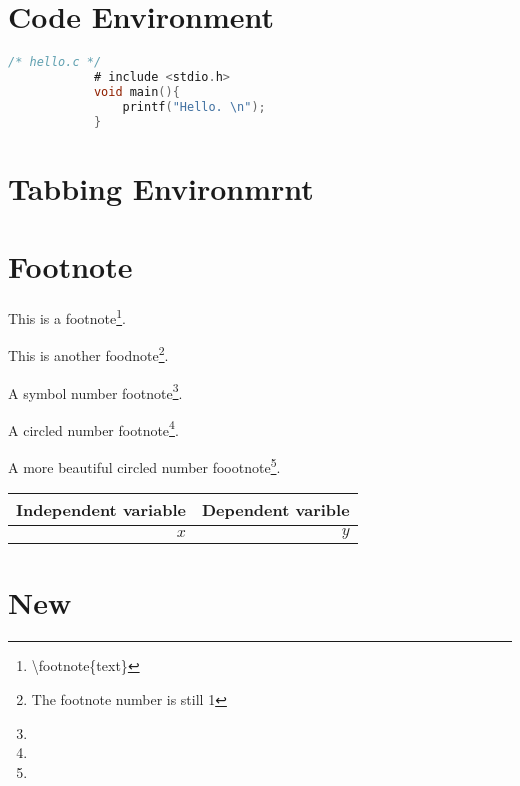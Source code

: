 \documentclass{article}
\begin{document}
    \section{Code Environment}
        \lstset{
            numbers=left,
            numberstyle=\footnotesize,
            basicstyle=\sffamily,
            keywordstyle=\bfseries,
            commentstyle=\rmfamily\itshape,
            stringstyle=\ttfamily
        }                                               %
        \begin{lstlisting}[language=C]
            /* hello.c */
            # include <stdio.h>
            void main(){
                printf("Hello. \n"); 
            }
        \end{lstlisting}
        {
            \lstset{language=C}
        }

    \section{Tabbing Environmrnt}

    \section{Footnote}
        This is a footnote\footnote{\textbackslash footnote\{text\}}. \par
        This is another foodnote\footnote[1]{The footnote number is still 1}. \par
        \renewcommand\thefootnote{\fnsymbol{footnote}}
        A symbol number footnote\footnote{}. \par
        \renewcommand\thefootnote{\textcircled{\arabic{footnote}}}
        A circled number footnote\footnote{}. \par
        \renewcommand\thefootnote{\ding{\numexpr171+\value{footnote}}}
        A more beautiful circled number foootnote\footnote{}. \par
        \begin{tabular}{r|r}
            Independent variable & Dependent varible\footnotemark \\
            \hline
            $x$ & $y$
        \end{tabular}
    \section{New}
        
\end{document}
